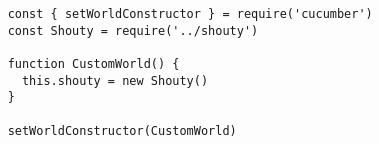 \begin{verbatim}
    const { setWorldConstructor } = require('cucumber')
    const Shouty = require('../shouty')

    function CustomWorld() {
      this.shouty = new Shouty()
    }

    setWorldConstructor(CustomWorld)
\end{verbatim}
